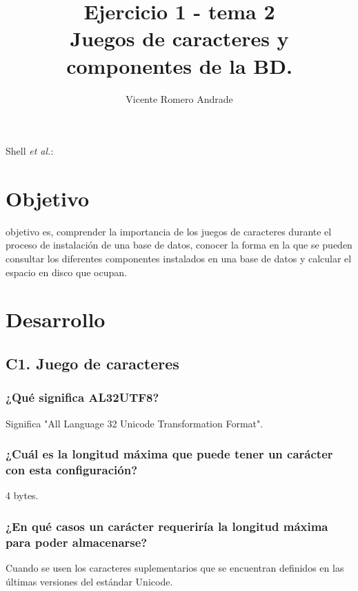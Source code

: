 \documentclass[journal]{IEEEtran}
\begin{document}
\title{Ejercicio 1 - tema 2 \\ Juegos de caracteres y componentes de la BD.}
%
\author{Vicente Romero Andrade}

%
{Shell \MakeLowercase{\textit{et al.}}: }

\maketitle


\IEEEpeerreviewmaketitle

\section{Objetivo}

 objetivo es, comprender la importancia de los juegos de caracteres durante el proceso de instalación de una base de datos, conocer la forma en la que se 
pueden consultar los diferentes componentes instalados en una base de datos y calcular el espacio en disco que ocupan.


\section{Desarrollo}
\subsection{C1. Juego de caracteres}
\subsubsection{¿Qué significa AL32UTF8?}
Significa "All Language 32 Unicode Transformation Format".
\subsubsection{¿Cuál es la longitud máxima que puede tener un carácter con esta configuración?}
4 bytes.\cite{AL32UTF8}
\subsubsection{¿En qué casos un carácter requeriría la longitud máxima para poder almacenarse?}
Cuando se usen los caracteres suplementarios que se encuentran definidos en las últimas versiones
del estándar Unicode.
\end{document}
